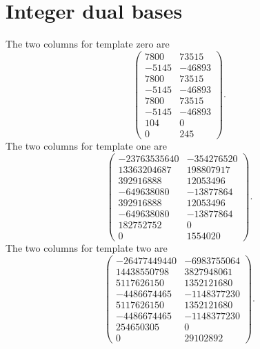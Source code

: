 \documentclass[11pt]{article}
\begin{document}
\appendix
\section*{Integer dual bases}
The two columns for template zero are
\[
\begin{pmatrix}
7800&73515\\-5145&-46893\\7800&73515\\-5145&-46893\\
7800&73515\\-5145&-46893\\104&0\\0&245
\end{pmatrix}.
\]
The two columns for template one are
\[
\begin{pmatrix}
-23763535640&-354276520\\13363204687&198807917\\
392916888&12053496\\-649638080&-13877864\\
392916888&12053496\\-649638080&-13877864\\
182752752&0\\0&1554020
\end{pmatrix}.
\]
The two columns for template two are
\[
\begin{pmatrix}
-26477449440&-6983755064\\14438550798&3827948061\\
5117626150&1352121680\\-4486674465&-1148377230\\
5117626150&1352121680\\-4486674465&-1148377230\\
254650305&0\\0&29102892
\end{pmatrix}.
\]
\end{document}
